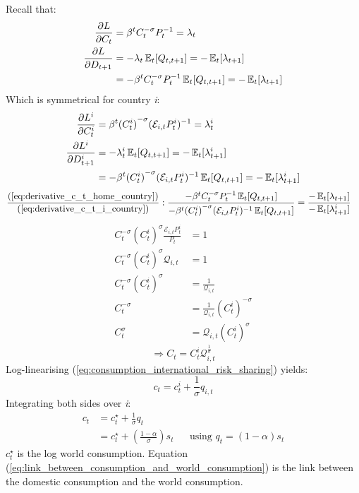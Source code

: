 \documentclass[12pt]{article}
\begin{document}
Recall that:
\begin{align}
    \frac{\partial L}{\partial C_t} &= \beta^t C_t^{-\sigma} P_{t}^{-1} = \lambda_t \nonumber\\
    \frac{\partial L}{\partial D_{t+1}} & = -\lambda_t \operatorname{\mathbb{E}}_t[Q_{t,t+1}] = -\operatorname{\mathbb{E}}_t[\lambda_{t+1}] \nonumber\\
    &=-\beta^t C_t^{-\sigma} P_{t}^{-1} \operatorname{\mathbb{E}}_t[Q_{t,t+1}] = -\operatorname{\mathbb{E}}_t[\lambda_{t+1}] \label{eq:derivative_c_t_home_country}
\end{align}
Which is symmetrical for country \textit{i}:
\begin{align}
    \frac{\partial L^i}{\partial C_t^i} &= \beta^t {(C^i_t)}^{-\sigma} (\mathcal{E}_{i,t}P^i_{t})^{-1} = \lambda^i_t \nonumber\\
    \frac{\partial L^i}{\partial D_{t+1}^i} & = -\lambda^i_t \operatorname{\mathbb{E}}_t[Q_{t,t+1}] = -\operatorname{\mathbb{E}}_t[\lambda^i_{t+1}] \nonumber\\
    &=-\beta^t {(C^i_t)}^{-\sigma} (\mathcal{E}_{i,t}P^i_{t})^{-1} \operatorname{\mathbb{E}}_t[Q_{t,t+1}] = -\operatorname{\mathbb{E}}_t[\lambda^i_{t+1}] \label{eq:derivative_c_t_i_country}
\end{align}
\begin{align*}
    \frac{\text{(\ref{eq:derivative_c_t_home_country})}}{\text{(\ref{eq:derivative_c_t_i_country})}}: \frac{-\beta^t C_t^{-\sigma} P_{t}^{-1} \operatorname{\mathbb{E}}_t[Q_{t,t+1}]}{-\beta^t {(C^i_t)}^{-\sigma} (\mathcal{E}_{i,t}P^i_{t})^{-1} \operatorname{\mathbb{E}}_t[Q_{t,t+1}]} &= \frac{-\operatorname{\mathbb{E}}_t[\lambda_{t+1}]}{-\operatorname{\mathbb{E}}_t[\lambda^i_{t+1}]}
\end{align*} 
\begin{align*}   
    C_t^{-\sigma}{(C^i_t)}^{\sigma} \frac{\mathcal{E}_{i,t}P^i_{t}}{P_t} &= 1 \\
    C_t^{-\sigma}{(C^i_t)}^{\sigma} \mathcal{Q}_{i,t} &= 1 \\
    C_t^{-\sigma}{(C^i_t)}^{\sigma}  &= \frac{1}{\mathcal{Q}_{i,t}} \\
    C_t^{-\sigma}  &= \frac{1}{\mathcal{Q}_{i,t}}{(C^i_t)}^{-\sigma} \\
    C_t^{\sigma}  &= \mathcal{Q}_{i,t}{(C^i_t)}^{\sigma}
\end{align*}
\begin{equation}\label{eq:consumption_international_risk_sharing}
    \Rightarrow C_t  = {C^i_t}\mathcal{Q}_{i,t}^{\frac{1}{\sigma}}
\end{equation}
Log-linearising (\ref{eq:consumption_international_risk_sharing}) yields:
\begin{equation}
    c_t = c_{t}^i + \frac{1}{\sigma}q_{i,t}
\end{equation}
Integrating both sides over \textit{i}:
\begin{align}
    c_t & = c_t^{\star} + \frac{1}{\sigma}q_t                                                                               &  &                                  \\
        & = c_t^{\star} + \left(\frac{1-\alpha}{\sigma}\right)s_t \label{eq:link_between_consumption_and_world_consumption} &  & \text{using $q_t=(1-\alpha)s_t$}
\end{align}
$c_t^{\star}$ is the log world consumption. Equation (\ref{eq:link_between_consumption_and_world_consumption}) is the link between the domestic consumption and the world consumption.
\end{document}
